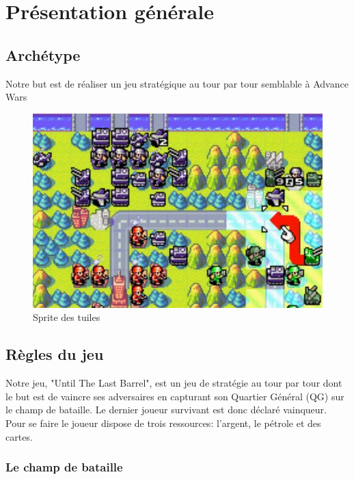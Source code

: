 
\section{Présentation générale}

\subsection{Archétype}

Notre but est de réaliser un jeu stratégique au tour par tour semblable à Advance Wars


\begin{figure}[h]
    \centering
    \includegraphics[scale = 0.5]{images/advanceWarsGameplay.jpg}
    \caption{Sprite des tuiles}
    \label{fig:Advance Wars}
\end{figure}


\subsection{Règles du jeu}

Notre jeu, "Until The Last Barrel", est un jeu de stratégie au tour par tour dont le but est de vaincre ses adversaires en capturant son Quartier Général (QG) sur le champ de bataille. Le dernier joueur survivant est donc déclaré vainqueur.
Pour se faire le joueur dispose de trois ressources: l'argent, le pétrole et des cartes.
\newpage

\subsubsection{Le champ de bataille}

